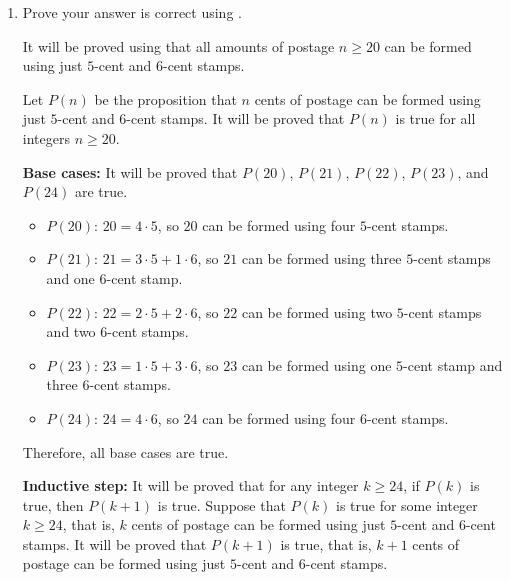 \begin{enumerate}
\begin{enumerate}
\begin{subprove}
      This conjecture will be proved in the next parts using  and .
    \end{subprove}
    \item Prove your answer is correct using .
    \begin{subprove}
      It will be proved using  that all amounts of postage \(n \geq 20\) can be formed using just \(5\)-cent and \(6\)-cent stamps.
      
      Let \(P(n)\) be the proposition that \(n\) cents of postage can be formed using just \(5\)-cent and \(6\)-cent stamps.
      It will be proved that \(P(n)\) is true for all integers \(n \geq 20\).
      
      \textbf{Base cases:} It will be proved that \(P(20)\), \(P(21)\), \(P(22)\), \(P(23)\), and \(P(24)\) are true.
      \begin{itemize}
        \item \(P(20)\): \(20 = 4 \cdot 5\), so \(20\) can be formed using four \(5\)-cent stamps.
        \item \(P(21)\): \(21 = 3 \cdot 5 + 1 \cdot 6\), so \(21\) can be formed using three \(5\)-cent stamps and one \(6\)-cent stamp.
        \item \(P(22)\): \(22 = 2 \cdot 5 + 2 \cdot 6\), so \(22\) can be formed using two \(5\)-cent stamps and two \(6\)-cent stamps.
        \item \(P(23)\): \(23 = 1 \cdot 5 + 3 \cdot 6\), so \(23\) can be formed using one \(5\)-cent stamp and three \(6\)-cent stamps.
        \item \(P(24)\): \(24 = 4 \cdot 6\), so \(24\) can be formed using four \(6\)-cent stamps.
      \end{itemize}
      Therefore, all base cases are true.
      
      \textbf{Inductive step:} It will be proved that for any integer \(k \geq 24\), if \(P(k)\) is true, then \(P(k+1)\) is true.
      Suppose that \(P(k)\) is true for some integer \(k \geq 24\), that is, \(k\) cents of postage can be formed using just \(5\)-cent and \(6\)-cent stamps.
      It will be proved that \(P(k+1)\) is true, that is, \(k+1\) cents of postage can be formed using just \(5\)-cent and \(6\)-cent stamps.
      

\end{subprove}
\end{enumerate}
\end{enumerate}
